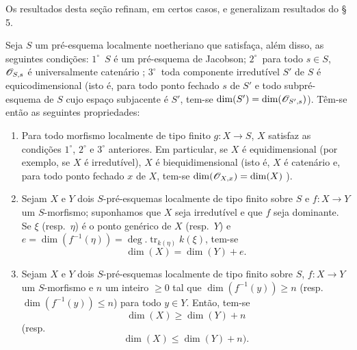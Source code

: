 Os resultados desta seção refinam, em certos casos, e generalizam resultados do \S\,5.

\begin{proposition}[10.6.1]
\label{IV.10.6.1}
Seja $S$ um pré-esquema localmente noetheriano que satisfaça, além disso, as seguintes condições: $1^\circ$~$S$ é um pré-esquema de Jacobson; $2^\circ$~para todo $s\in S$, $\mathscr{O}_{S,s}$ é universalmente catenário ; $3^\circ$~toda componente irredutível $S'$ de $S$ é equicodimensional (isto é, para todo ponto fechado $s$ de $S'$ e todo subpré-esquema de $S$ cujo espaço subjacente é $S'$, tem-se $\dim(S')=\dim(\mathscr{O}_{S',s})$).
Têm-se então as seguintes propriedades:
\begin{enumerate}[label=(\roman*)]
  \item Para todo morfismo localmente de tipo finito $g:X\to S$, $X$ satisfaz as condições $1^\circ$, $2^\circ$ e $3^\circ$ anteriores.
Em particular, se $X$ é equidimensional (por exemplo, se $X$ é irredutível), $X$ é biequidimensional (isto é, $X$ é catenário e, para todo ponto fechado $x$ de $X$, tem-se $\dim(\mathscr{O}_{X,x})=\dim(X)$ ).
  \item Sejam $X$ e $Y$ dois $S$-pré-esquemas localmente de tipo finito sobre $S$ e $f:X\to Y$ um $S$-morfismo; suponhamos que $X$ seja irredutível e que $f$ seja dominante.
Se $\xi$ (resp.\ $\eta$) é o ponto genérico de $X$ (resp.\ $Y$) e $e=\dim(f^{-1}(\eta))=\deg.\operatorname{tr}_{k(\eta)}k(\xi)$, tem-se
\begin{equation}
\label{IV.10.6.1.1}
\tag{10.6.1.1}
\dim(X)=\dim(Y)+e.
\end{equation}
  \item Sejam $X$ e $Y$ dois $S$-pré-esquemas localmente de tipo finito sobre $S$, $f:X\to Y$ um $S$-morfismo e $n$ um inteiro $\geq0$ tal que $\dim(f^{-1}(y))\geq n$ (resp.\ $\dim(f^{-1}(y))\leq n$) para todo $y\in Y$.
Então, tem-se
\begin{equation}
\label{IV.10.6.1.2}
\tag{10.6.1.2}
\dim(X)\geq\dim(Y)+n
\end{equation}
(resp.
\begin{equation}
\label{IV.10.6.1.3}
\tag{10.6.1.3}
\dim(X)\leq\dim(Y)+n).
\end{equation}
\end{enumerate}
\end{proposition}

